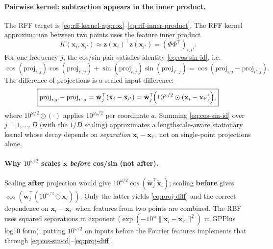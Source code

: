 \documentclass[11pt]{article}
\newcommand{\Ph}{\Phi}
\begin{document}
\paragraph{Pairwise kernel: subtraction appears in the inner product.}
The RFF target is \eqref{eq:rff-kernel-approx}--\eqref{eq:rff-inner-product}.
The RFF kernel approximation between two points uses the feature inner product
\[
  K(\mathbf x_i,\mathbf x_{i'}) \approx \mathbf z(\mathbf x_i)^{\top}\mathbf z(\mathbf x_{i'})
  = (\Ph\Ph^{\top})_{i,i'}.
\]
For one frequency $j$, the cos/sin pair satisfies identity \eqref{eq:cos-sin-id}, i.e.\
\[
  \cos(\mathrm{proj}_{i,j})\cos(\mathrm{proj}_{i',j})
  + \sin(\mathrm{proj}_{i,j})\sin(\mathrm{proj}_{i',j})
  = \cos(\mathrm{proj}_{i,j}-\mathrm{proj}_{i',j}).
\]
The difference of projections is a scaled input difference:
\begin{equation}
  \label{eq:proj-diff}
  \boxed{
  \mathrm{proj}_{i,j}-\mathrm{proj}_{i',j}
  = \tilde{\mathbf w}_j^{\top}(\tilde{\mathbf x}_i-\tilde{\mathbf x}_{i'})
  = \tilde{\mathbf w}_j^{\top}\!\Bigl(10^{\omega/2}\odot(\mathbf x_i-\mathbf x_{i'})\Bigr),
  }
\end{equation}
where $10^{\omega/2}\odot(\cdot)$ applies $10^{\omega_a/2}$ per coordinate $a$.
Summing \eqref{eq:cos-sin-id} over $j=1,\ldots,D$ (with the $1/D$ scaling) approximates a lengthscale-aware
stationary kernel whose decay depends on \emph{separation} $\mathbf x_i-\mathbf x_{i'}$, not on single-point projections alone.

\paragraph{Why $10^{\omega/2}$ scales $\mathbf x$ \emph{before} cos/sin (not after).}
Scaling \textbf{after} projection would give $10^{\omega/2}\cos(\tilde{\mathbf w}_j^{\top}\tilde{\mathbf x}_i)$; scaling \textbf{before} gives
$\cos(\tilde{\mathbf w}_j^{\top}(10^{\omega/2}\odot\mathbf x_i))$.
Only the latter yields \eqref{eq:proj-diff} and the correct dependence on $\mathbf x_i-\mathbf x_{i'}$ when features from two points are combined.
The RBF uses squared separations in exponent ($\exp(-10^{\omega}\|\mathbf x_i-\mathbf x_{i'}\|^2)$ in GPPlus log10 form); putting $10^{\omega/2}$ on inputs before the Fourier features implements that through \eqref{eq:cos-sin-id}--\eqref{eq:proj-diff}.
\end{document}
